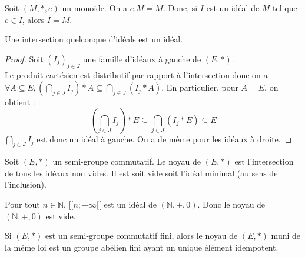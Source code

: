 \begin{remarque}
Soit $(M, *, e)$ un monoïde.
On a ${e}.M = M$.
Donc, si $I$ est un idéal de $M$ tel que $e \in I$, alors $I = M$.
\end{remarque}

\begin{proposition}
Une intersection quelconque d'idéals est un idéal.
\end{proposition}

\begin{proof}
Soit $\left(I_j\right)_{j \in J}$ une famille d'idéaux à gauche de $(E, *)$. \\
Le produit cartésien est distributif par rapport à l'intersection donc on a $\forall A \subseteq E, \left(\bigcap_{j \in J} I_j\right) * A \subseteq \bigcap_{j \in J} \left(I_j * A\right)$.
En particulier, pour $A = E$, on obtient :
$$
\left( \bigcap_{j \in J} I_j \right) * E \subseteq \bigcap_{j \in J} \left( I_j * E \right) \subseteq E
$$
$\bigcap_{j \in J} I_j$ est donc un idéal à gauche.
On a de même pour les idéaux à droite.
\end{proof}

\begin{definition}[Noyau]
Soit $(E, *)$ un semi-groupe commutatif.
Le noyau de $(E, *)$ est l'intersection de tous les idéaux non vides.
Il est soit vide soit l'idéal minimal (au sens de l'inclusion).
\end{definition}

\begin{exemple}
Pour tout $n \in \mathbb{N}$, $[\![n;+\infty[\![$ est un idéal de
$\left(\mathbb{N}, +, 0\right)$.
Donc le noyau de $\left(\mathbb{N}, +, 0\right)$ est vide.
\end{exemple}

\begin{theoreme}
Si $(E, *)$ est un semi-groupe commutatif fini, alors
le noyau de $(E, *)$ muni de la même loi est un groupe abélien fini
ayant un unique élément idempotent.
\end{theoreme}

